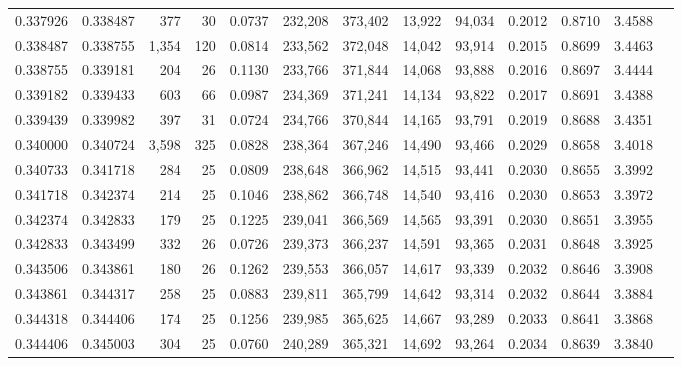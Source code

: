 \begin{tabular}{rrrrrrrrrrrrr}
0.337926 & 0.338487 &   377 &  30 &                                     0.0737 & 232,208 & 373,402 &  13,922 &  94,034 & 0.2012 & 0.8710 & 3.4588 \\
0.338487 & 0.338755 & 1,354 & 120 &                                     0.0814 & 233,562 & 372,048 &  14,042 &  93,914 & 0.2015 & 0.8699 & 3.4463 \\
0.338755 & 0.339181 &   204 &  26 &                                     0.1130 & 233,766 & 371,844 &  14,068 &  93,888 & 0.2016 & 0.8697 & 3.4444 \\
0.339182 & 0.339433 &   603 &  66 &                                     0.0987 & 234,369 & 371,241 &  14,134 &  93,822 & 0.2017 & 0.8691 & 3.4388 \\
0.339439 & 0.339982 &   397 &  31 &                                     0.0724 & 234,766 & 370,844 &  14,165 &  93,791 & 0.2019 & 0.8688 & 3.4351 \\
0.340000 & 0.340724 & 3,598 & 325 &                                     0.0828 & 238,364 & 367,246 &  14,490 &  93,466 & 0.2029 & 0.8658 & 3.4018 \\
0.340733 & 0.341718 &   284 &  25 &                                     0.0809 & 238,648 & 366,962 &  14,515 &  93,441 & 0.2030 & 0.8655 & 3.3992 \\
0.341718 & 0.342374 &   214 &  25 &                                     0.1046 & 238,862 & 366,748 &  14,540 &  93,416 & 0.2030 & 0.8653 & 3.3972 \\
0.342374 & 0.342833 &   179 &  25 &                                     0.1225 & 239,041 & 366,569 &  14,565 &  93,391 & 0.2030 & 0.8651 & 3.3955 \\
0.342833 & 0.343499 &   332 &  26 &                                     0.0726 & 239,373 & 366,237 &  14,591 &  93,365 & 0.2031 & 0.8648 & 3.3925 \\
0.343506 & 0.343861 &   180 &  26 &                                     0.1262 & 239,553 & 366,057 &  14,617 &  93,339 & 0.2032 & 0.8646 & 3.3908 \\
0.343861 & 0.344317 &   258 &  25 &                                     0.0883 & 239,811 & 365,799 &  14,642 &  93,314 & 0.2032 & 0.8644 & 3.3884 \\
0.344318 & 0.344406 &   174 &  25 &                                     0.1256 & 239,985 & 365,625 &  14,667 &  93,289 & 0.2033 & 0.8641 & 3.3868 \\
0.344406 & 0.345003 &   304 &  25 &                                     0.0760 & 240,289 & 365,321 &  14,692 &  93,264 & 0.2034 & 0.8639 & 3.3840 \\

\end{tabular}
